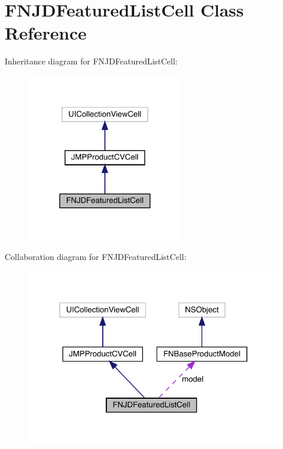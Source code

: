 \hypertarget{interface_f_n_j_d_featured_list_cell}{}\section{F\+N\+J\+D\+Featured\+List\+Cell Class Reference}
\label{interface_f_n_j_d_featured_list_cell}


Inheritance diagram for F\+N\+J\+D\+Featured\+List\+Cell\+:\nopagebreak
\begin{figure}[H]
\begin{center}
\leavevmode
\includegraphics[width=194pt]{interface_f_n_j_d_featured_list_cell__inherit__graph}
\end{center}
\end{figure}


Collaboration diagram for F\+N\+J\+D\+Featured\+List\+Cell\+:\nopagebreak
\begin{figure}[H]
\begin{center}
\leavevmode
\includegraphics[width=317pt]{interface_f_n_j_d_featured_list_cell__coll__graph}
\end{center}
\end{figure}
